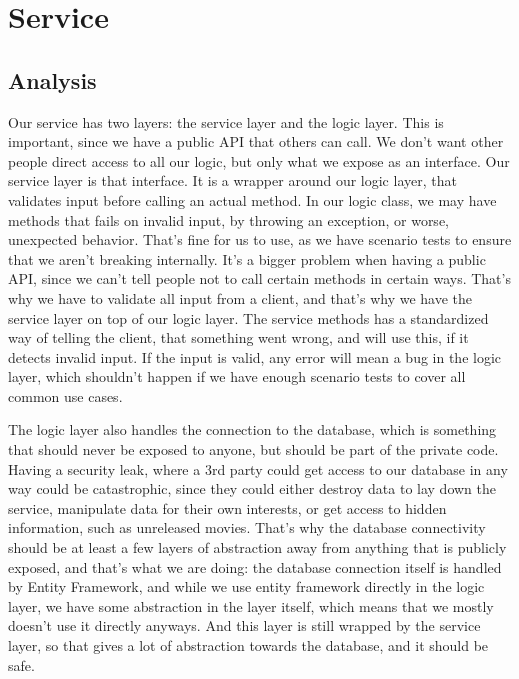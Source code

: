 \section{Service}
\label{Design_Service}

\subsection{Analysis}
\label{Design_Service_Analysis}

Our service has two layers: the service layer and the logic layer. This is important, since we have a public API that others can call. We don't want other people direct access to all our logic, but only what we expose as an interface. Our service layer is that interface. It is a wrapper around our logic layer, that validates input before calling an actual method. In our logic class, we may have methods that fails on invalid input, by throwing an exception, or worse, unexpected behavior. That's fine for us to use, as we have scenario tests to ensure that we aren't breaking internally. It's a bigger problem when having a public API, since we can't tell people not to call certain methods in certain ways. That's why we have to validate all input from a client, and that's why we have the service layer on top of our logic layer. The service methods has a standardized way of telling the client, that something went wrong, and will use this, if it detects invalid input. If the input is valid, any error will mean a bug in the logic layer, which shouldn't happen if we have enough scenario tests to cover all common use cases. 

The logic layer also handles the connection to the database, which is something that should never be exposed to anyone, but should be part of the private code. Having a security leak, where a 3rd party could get access to our database in any way could be catastrophic, since they could either destroy data to lay down the service, manipulate data for their own interests, or get access to hidden information, such as unreleased movies. That's why the database connectivity should be at least a few layers of abstraction away from anything that is publicly exposed, and that's what we are doing: the database connection itself is handled by Entity Framework, and while we use entity framework directly in the logic layer, we have some abstraction in the layer itself, which means that we mostly doesn't use it directly anyways. And this layer is still wrapped by the service layer, so that gives a lot of abstraction towards the database, and it should be safe. 

